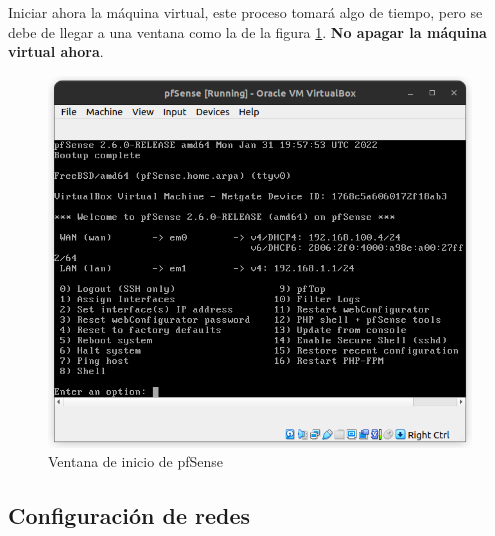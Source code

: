 \documentclass{article}
\begin{document}
            Iniciar ahora la máquina virtual, este proceso tomará algo de tiempo, pero se debe de llegar a una ventana como la de la figura \ref{fig:pfsense-init}. \textbf{No apagar la máquina virtual ahora}.
            \begin{figure}[!htbp]
                \centering
                \includegraphics[scale=0.3]{img/pfsense-init.png}
                \caption{Ventana de inicio de pfSense}
                \label{fig:pfsense-init}
            \end{figure}
        
        \subsection{Configuración de redes}
\end{document}
